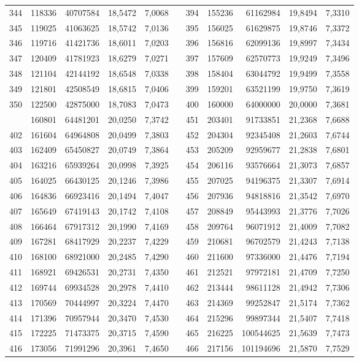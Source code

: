\begin{longtable}{rrrrrrrrrrr}
344&118336&40707584&18,5472&7,0068&&394&155236&61162984&19,8494&7,3310\\
345&119025&41063625&18,5742&7,0136&&395&156025&61629875&19,8746&7,3372\\
346&119716&41421736&18,6011&7,0203&&396&156816&62099136&19,8997&7,3434\\
347&120409&41781923&18,6279&7,0271&&397&157609&62570773&19,9249&7,3496\\
348&121104&42144192&18,6548&7,0338&&398&158404&63044792&19,9499&7,3558\\
349&121801&42508549&18,6815&7,0406&&399&159201&63521199&19,9750&7,3619\\
350&122500&42875000&18,7083&7,0473&&400&160000&64000000&20,0000&7,3681\\
\newpage
401&160801&64481201&20,0250&7,3742&&451&203401&91733851&21,2368&7,6688\\
402&161604&64964808&20,0499&7,3803&&452&204304&92345408&21,2603&7,6744\\
403&162409&65450827&20,0749&7,3864&&453&205209&92959677&21,2838&7,6801\\
404&163216&65939264&20,0998&7,3925&&454&206116&93576664&21,3073&7,6857\\
405&164025&66430125&20,1246&7,3986&&455&207025&94196375&21,3307&7,6914\\
406&164836&66923416&20,1494&7,4047&&456&207936&94818816&21,3542&7,6970\\
407&165649&67419143&20,1742&7,4108&&457&208849&95443993&21,3776&7,7026\\
408&166464&67917312&20,1990&7,4169&&458&209764&96071912&21,4009&7,7082\\
409&167281&68417929&20,2237&7,4229&&459&210681&96702579&21,4243&7,7138\\
410&168100&68921000&20,2485&7,4290&&460&211600&97336000&21,4476&7,7194\\
411&168921&69426531&20,2731&7,4350&&461&212521&97972181&21,4709&7,7250\\
412&169744&69934528&20,2978&7,4410&&462&213444&98611128&21,4942&7,7306\\
413&170569&70444997&20,3224&7,4470&&463&214369&99252847&21,5174&7,7362\\
414&171396&70957944&20,3470&7,4530&&464&215296&99897344&21,5407&7,7418\\
415&172225&71473375&20,3715&7,4590&&465&216225&100544625&21,5639&7,7473\\
416&173056&71991296&20,3961&7,4650&&466&217156&101194696&21,5870&7,7529\\

\end{longtable}
